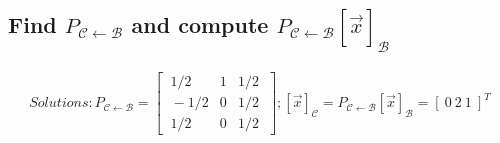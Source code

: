 \documentclass[../main.tex]{subfiles}
\begin{document}
\subsection{Find $P_{\mathcal{C} \leftarrow \mathcal{B}}$ and compute $P_{\mathcal{C} \leftarrow \mathcal{B}}[\vec{x}]_{\mathcal{B}}$}
\begin{align*}
        \boxed{
        Solutions: P_{\mathcal{C} \leftarrow \mathcal{B}} =
        \begin{bmatrix}
                \ {1}/{2}  & 1 & {1}/{2} \ \\
                \ -{1}/{2} & 0 & {1}/{2} \ \\
                \ {1}/{2}  & 0 & {1}/{2} \
        \end{bmatrix}; [\vec{x}]_\mathcal{C} = P_{\mathcal{C} \leftarrow \mathcal{B}}[\vec{x}]_{\mathcal{B}} = [\ 0 \ 2 \ 1\ ]^T
                }
\end{align*}
\end{document}

